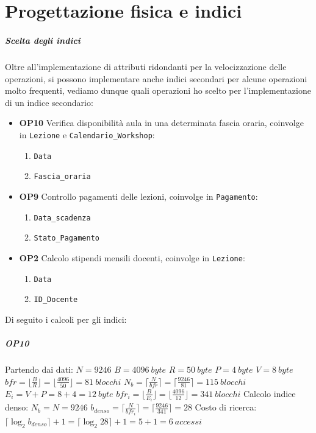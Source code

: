 \chapter{Progettazione fisica e indici}
\paragraph{Scelta degli indici} Oltre all'implementazione di attributi ridondanti per la velocizzazione delle operazioni, si possono implementare anche indici secondari per alcune operazioni molto frequenti, vediamo dunque quali operazioni ho scelto per l'implementazione di un indice secondario: 
\begin{itemize}
    \item \textbf{OP10} Verifica disponibilità aula in  una determinata fascia oraria, coinvolge in \texttt{Lezione} e \texttt{Calendario\_Workshop}:
    \begin{enumerate}
        \item \texttt{Data}
        \item \texttt{Fascia\_oraria}
    \end{enumerate}
    \item \textbf{OP9} Controllo pagamenti delle lezioni, coinvolge in \texttt{Pagamento}: 
    \begin{enumerate}
        \item \texttt{Data\_scadenza}
        \item \texttt{Stato\_Pagamento}
    \end{enumerate}
    \item \textbf{OP2} Calcolo stipendi mensili docenti, coinvolge in \texttt{Lezione}: 
    \begin{enumerate}
        \item \texttt{Data}
        \item \texttt{ID\_Docente}
    \end{enumerate}
\end{itemize}
Di seguito i calcoli per gli indici: 
\paragraph{OP10} Partendo dai dati: 
\newline
$N = 9246$
\newline
$B = 4096\ byte$
\newline
$R = 50\ byte$
\newline
$P = 4\ byte$
\newline
$V = 8\ byte$
\newline
\newline
$bfr = \lfloor \frac{B}{R} \rfloor = \lfloor \frac{4096}{50} \rfloor = 81 \ blocchi$
\newline
$N_b = \lceil \frac{N}{bfr} \rceil = \lceil \frac{9246}{81} \rceil = 115\ blocchi$
\newline
$E_i = V + P = 8 + 4 = 12\ byte$
\newline
$bfr_i = \lfloor \frac{B}{E_i} \rfloor = \lfloor \frac{4096}{12} \rfloor = 341\ blocchi$
\newline
Calcolo indice denso: 
$N_b = N = 9246$
$b_{denso} = \lceil \frac{N}{bfr_i} \rceil = \lceil \frac{9246}{341} \rceil = 28$
Costo di ricerca: 
$\lceil \log_2{b_{denso}} \rceil + 1 = \lceil \log_2{28} \rceil + 1 = 5 + 1 = 6\ accessi$
